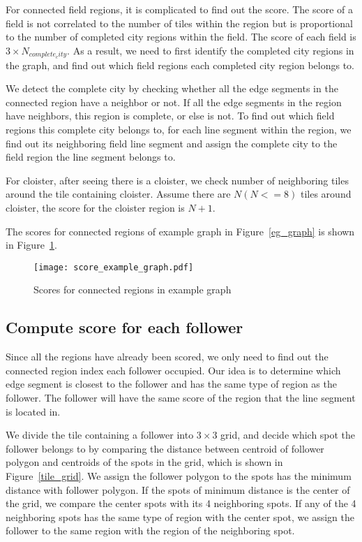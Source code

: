 For connected field regions, it is complicated to find out the score. The score of a field is not correlated to the number of tiles within the region but is proportional to the number of completed city regions within the field. The score of each field is $3\times N_{complete_city}$. As a result, we need to first identify the completed 
city regions in the graph, and find out which field regions each completed city region belongs to.

We detect the complete city by checking whether all the edge segments in the connected region have a neighbor or not. If all the edge segments in the 
region have neighbors, this region is complete, or else is not. To find out which field regions this complete city belongs to, for each 
line segment within the region, we find out its neighboring field line segment and assign the complete city to the field region the line segment belongs to.

For cloister, after seeing there is a cloister, we check number of neighboring tiles around the tile containing cloister. Assume there are $N(N<=8)$ tiles around cloister, the score for the cloister region is $N+1$.

The scores for connected regions of example graph in Figure~\ref{eg_graph} is shown in Figure~\ref{score_eg_graph}.

\begin{figure}[htbp]
	  \centering
	  \texttt{[image: score\_example\_graph.pdf]}
	  \caption{Scores for connected regions in example graph}
	  \label{score_eg_graph}
\end{figure}

\subsection{Compute score for each follower}
Since all the regions have already been scored, we only need to find out the connected region index each follower occupied. Our idea is to 
determine which edge segment is closest to the follower and has the same type of region as the follower. The follower will have the same score of the region that the line segment is located in.

We divide the tile containing a follower into $3\times3$ grid, and decide which spot the follower belongs to by comparing the distance between centroid of follower polygon and centroids 
of the spots in the grid, which is shown in Figure~\ref{tile_grid}. We assign the follower polygon to the spots has the minimum distance 
with follower polygon. If the spots of minimum distance is the center of the grid, we compare the center spots with its 4 neighboring spots. If any of the 4 neighboring spots has the same type of region with the center spot, we assign the follower to the same region with the region of the neighboring spot. 

